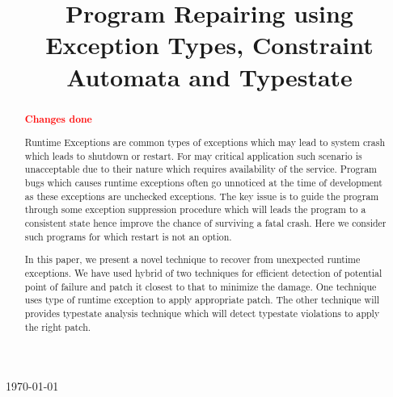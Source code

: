\documentclass{sigplanconf}
\begin{document}
\setlength{\pdfpageheight}{\paperheight}
\setlength{\pdfpagewidth}{\paperwidth}






\title{Program Repairing using Exception Types, Constraint Automata and Typestate}

           {\today}
           {}

\maketitle

\begin{abstract}

\textcolor{red}{\textbf{Changes done}}\newline

Runtime Exceptions are common types of exceptions which may lead to system crash which leads to shutdown or restart. For may critical application such scenario is unacceptable due to their nature which requires availability of the service. 
Program bugs which causes runtime exceptions often go unnoticed at the time of development as these exceptions are unchecked exceptions. The key issue is to guide the program through some exception suppression procedure which will leads the program to a consistent state hence improve the chance of surviving a fatal crash. Here we consider such programs for which restart is not an option.

In this paper, we present a novel technique to recover from unexpected runtime exceptions. We have used hybrid of two techniques for efficient detection of potential point of failure and patch it closest to that to minimize the damage. One technique uses type of runtime exception to apply appropriate patch.  The other technique will provides typestate analysis technique which will detect typestate violations to apply the right patch.

\end{abstract}
\end{document}
